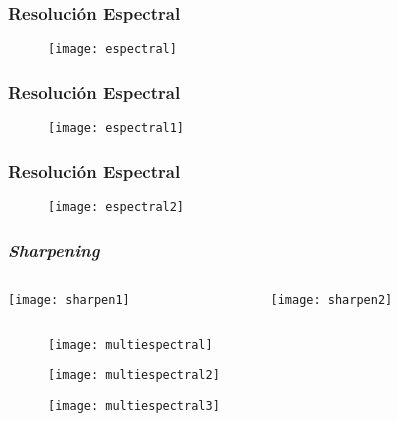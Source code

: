 \documentclass[14pt]{beamer}
\begin{document}
\begin{frame}
\frametitle{Resolución Espectral}
 \begin{figure}
    \centering
    \texttt{[image: espectral]}
  \end{figure}
\end{frame}
\begin{frame}
\frametitle{Resolución Espectral}
 \begin{figure}
    \centering
    \texttt{[image: espectral1]}
  \end{figure}
\end{frame}
\begin{frame}
\frametitle{Resolución Espectral}
 \begin{figure}
    \centering
    \texttt{[image: espectral2]}
  \end{figure}
\end{frame}
\begin{frame}
\frametitle{\emph{Sharpening}}
  \begin{columns}
		\begin{column}{.7\linewidth}
		 \texttt{[image: sharpen1]}
		\end{column}
		\begin{column}{.3\linewidth}
\texttt{[image: sharpen2]}
		\end{column}
	\end{columns}
\end{frame}
\begin{frame}
 \begin{figure}
    \centering
    \texttt{[image: multiespectral]}
  \end{figure}
\end{frame}
\begin{frame}
 \begin{figure}
    \centering
    \texttt{[image: multiespectral2]}
  \end{figure}
\end{frame}
\begin{frame}
 \begin{figure}
    \centering
    \texttt{[image: multiespectral3]}
  \end{figure}
\end{frame}
\end{document}
